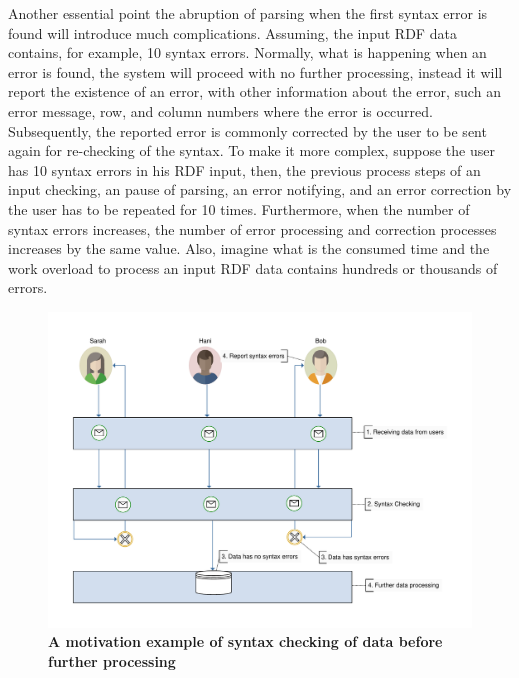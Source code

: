 Another essential point the abruption of parsing when the first syntax error is found will introduce much complications. Assuming, the input RDF data contains, for example, 10 syntax errors. Normally, what is happening when an error is found, the system will proceed with no further processing, instead it will report the existence of an error, with other information about the error, such an error message, row, and column numbers where the error is occurred. Subsequently, the reported error is commonly corrected by the user to be sent again for re-checking of the syntax. To make it more complex, suppose the user has 10 syntax errors in his RDF input, then, the previous process steps of an input checking, an pause of parsing, an error notifying, and an error correction by the user has to be repeated for 10 times.  Furthermore, when the number of syntax errors increases, the number of error processing and correction processes increases by the same value. Also, imagine what is the consumed time and the work overload to process an input RDF data contains hundreds or thousands of errors.  

	\begin{figure}[ht]
		\begin{center}
			\includegraphics[scale=0.5,angle=0]{images/motivation}
			\caption{\textbf{A motivation example of syntax checking of data before further processing}}
			\label{Fig:Motivation}
		\end{center}
	\end{figure}

